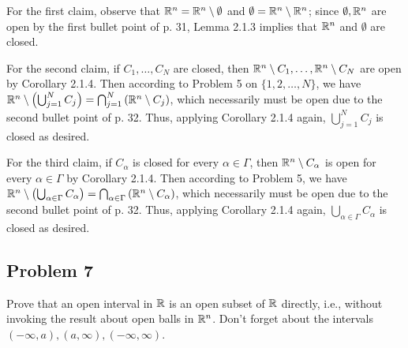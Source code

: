 \documentclass[main.tex]{subfiles}
\begin{document}
\begin{soln}
    For the first claim, observe that $\mathbb R^n = \mathbb R^n \setminus \emptyset$ and $\emptyset = \mathbb R^n \setminus \mathbb R^n$; since $\emptyset, \mathbb R^n$ are open by the first bullet point of p. 31, Lemma 2.1.3 implies that $\mathbb R^n$ and $\emptyset$ are closed.

    For the second claim, if $C_1, \ldots , C_N$ are closed, then $\mathbb R^n \setminus C_1, \ldots , \mathbb R^n \setminus C_N$ are open by Corollary 2.1.4. Then according to Problem 5 on $\{1, 2, \ldots , N\}$, we have $\mathbb R^n \setminus \left( \bigcup_{j = 1}^N C_j \right) = \bigcap_{j = 1}^N \left( \mathbb R^n \setminus C_j \right)$, which necessarily must be open due to the second bullet point of p. 32. Thus, applying Corollary 2.1.4 again, $\bigcup_{j = 1}^N C_j$ is closed as desired.

    For the third claim, if $C_\alpha$ is closed for every $\alpha\in \Gamma$, then $\mathbb R^n \setminus C_\alpha$ is open for every $\alpha\in\Gamma$ by Corollary 2.1.4. Then according to Problem 5, we have $\mathbb R^n \setminus \left( \bigcup_{\alpha\in\Gamma} C_\alpha \right) = \bigcap_{\alpha\in\Gamma} \left( \mathbb R^n \setminus C_\alpha \right)$, which necessarily must be open due to the second bullet point of p. 32. Thus, applying Corollary 2.1.4 again, $\bigcup_{\alpha\in\Gamma} C_\alpha$ is closed as desired.
\end{soln}
\eject

\subsection{Problem 7}
\begin{claim}
    Prove that an open interval in $\mathbb R$ is an open subset of $\mathbb R$ directly, i.e., without invoking the result about open balls in $\mathbb R^n$. Don’t forget about the intervals $(-\infty,a), (a,\infty), (-\infty,\infty)$.
\end{claim}
\end{document}
